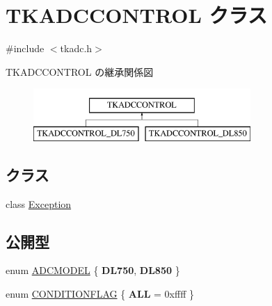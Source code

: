 \hypertarget{class_t_k_a_d_c_c_o_n_t_r_o_l}{}\section{T\+K\+A\+D\+C\+C\+O\+N\+T\+R\+OL クラス}
\label{class_t_k_a_d_c_c_o_n_t_r_o_l}


{\ttfamily \#include $<$tkadc.\+h$>$}

T\+K\+A\+D\+C\+C\+O\+N\+T\+R\+OL の継承関係図\begin{figure}[H]
\begin{center}
\leavevmode
\includegraphics[height=2.000000cm]{class_t_k_a_d_c_c_o_n_t_r_o_l}
\end{center}
\end{figure}
\subsection*{クラス}
\begin{DoxyCompactItemize}
\item 
class \hyperlink{class_t_k_a_d_c_c_o_n_t_r_o_l_1_1_exception}{Exception}
\end{DoxyCompactItemize}
\subsection*{公開型}
\begin{DoxyCompactItemize}
\item 
enum \hyperlink{class_t_k_a_d_c_c_o_n_t_r_o_l_a9a5cfed6c86912f4b9053c8707cf89dd}{A\+D\+C\+M\+O\+D\+EL} \{ {\bfseries D\+L750}, 
{\bfseries D\+L850}
 \}
\item 
enum \hyperlink{class_t_k_a_d_c_c_o_n_t_r_o_l_a4ec8bb3e68a489f7a757d08a855ffb61}{C\+O\+N\+D\+I\+T\+I\+O\+N\+F\+L\+AG} \{ {\bfseries A\+LL} = 0xffff
 \}
\end{DoxyCompactItemize}
